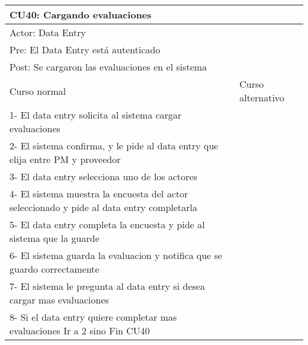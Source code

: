 \begin{table}[H]
  \begin{adjustbox}{max width = \textwidth}
  \begin{tabular}{|l|l|}
    \hline
    \multicolumn{2}{|l|}{CU40: Cargando evaluaciones} \\\hline
    \multicolumn{2}{|l|}{Actor: Data Entry} \\\hline
    \multicolumn{2}{|l|}{Pre: El Data Entry está autenticado} \\\hline
    \multicolumn{2}{|l|}{Post: Se cargaron las evaluaciones en el sistema} \\\hline
     Curso normal & Curso alternativo\\ \hline
	 1- El data entry solicita al sistema cargar evaluaciones & \\ \hline
	 2- El sistema confirma, y le pide al data entry que elija entre PM y proveedor & \\ \hline
	 3- El data entry selecciona uno de los actores & \\ \hline
     4- El sistema muestra la encuesta del actor seleccionado y pide al data entry completarla & \\ \hline
     5- El data entry completa la encuesta y pide al sistema que la guarde & \\ \hline
	 6- El sistema guarda la evaluacion y notifica que se guardo correctamente& \\ \hline
     7- El sistema le pregunta al data entry si desea cargar mas evaluaciones & \\ \hline
	 8- Si el data entry quiere completar mas evaluaciones Ir a 2 sino Fin CU40 & \\ \hline
  \end{tabular}
  \end{adjustbox}
\end{table}


